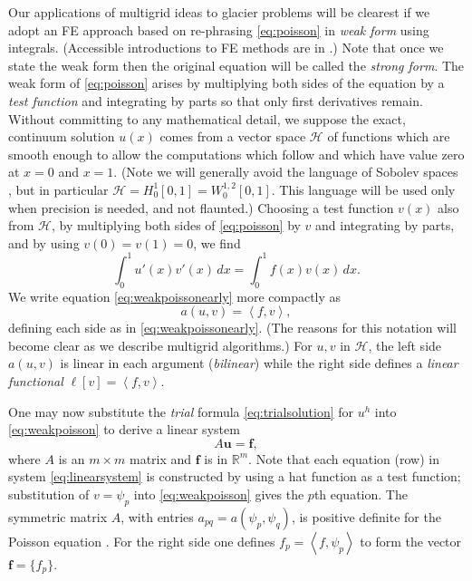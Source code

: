 \documentclass[letterpaper,final,12pt,reqno]{amsart}
\newcommand{\RR}{\mathbb{R}}
\newcommand{\bbf}{\mathbf{f}}
\newcommand{\bu}{\mathbf{u}}
\newcommand{\ip}[2]{\left<#1,#2\right>}
\numberwithin{equation}{section}
\numberwithin{figure}{section}
\numberwithin{table}{section}
\begin{document}
Our applications of multigrid ideas to glacier problems will be clearest if we adopt an FE approach based on re-phrasing \eqref{eq:poisson} in \emph{weak form} using integrals.  (Accessible introductions to FE methods are in \cite{Bueler2021,Elmanetal2014,Johnson2009}.)  Note that once we state the weak form then the original equation will be called the \emph{strong form}.  The weak form of \eqref{eq:poisson} arises by multiplying both sides of the equation by a \emph{test function} and integrating by parts so that only first derivatives remain.  Without committing to any mathematical detail, we suppose the exact, continuum solution $u(x)$ comes from a vector space $\mathcal{H}$ of functions which are smooth enough to allow the computations which follow and which have value zero at $x=0$ and $x=1$.  (Note we will generally avoid the language of Sobolev spaces \cite[for example]{Evans2010}, but in particular $\mathcal{H}=H_0^1[0,1]=W_0^{1,2}[0,1]$.  This language will be used only when precision is needed, and not flaunted.)  Choosing a test function $v(x)$ also from $\mathcal{H}$, by multiplying both sides of \eqref{eq:poisson} by $v$ and integrating by parts, and by using $v(0)=v(1)=0$, we find
\begin{equation}
\int_0^1 u'(x) v'(x)\,dx = \int_0^1 f(x) v(x)\, dx.  \label{eq:weakpoissonearly}
\end{equation}
We write equation \eqref{eq:weakpoissonearly} more compactly as
\begin{equation}
  a(u,v) = \ip{f}{v}, \label{eq:weakpoisson}
\end{equation}
defining each side as in \eqref{eq:weakpoissonearly}.  (The reasons for this notation will become clear as we describe multigrid algorithms.)  For $u,v$ in $\mathcal{H}$, the left side $a(u,v)$ is linear in each argument (\emph{bilinear}) while the right side defines a \emph{linear functional} $\ell[v] = \ip{f}{v}$.

One may now substitute the \emph{trial} formula \eqref{eq:trialsolution} for $u^h$ into \eqref{eq:weakpoisson} to derive a linear system
\begin{equation}
A \bu = \bbf, \label{eq:linearsystem}
\end{equation}
where $A$ is an $m\times m$ matrix and $\bbf$ is in $\RR^m$.  Note that each equation (row) in system \eqref{eq:linearsystem} is constructed by using a hat function as a test function; substitution of $v=\psi_p$ into \eqref{eq:weakpoisson} gives the $p$th equation.  The symmetric matrix $A$, with entries $a_{pq} = a(\psi_p,\psi_q)$, is positive definite for the Poisson equation \cite{Elmanetal2014}.  For the right side one defines $f_p = \ip{f}{\psi_p}$ to form the vector $\bbf = \{f_p\}$.
\end{document}
